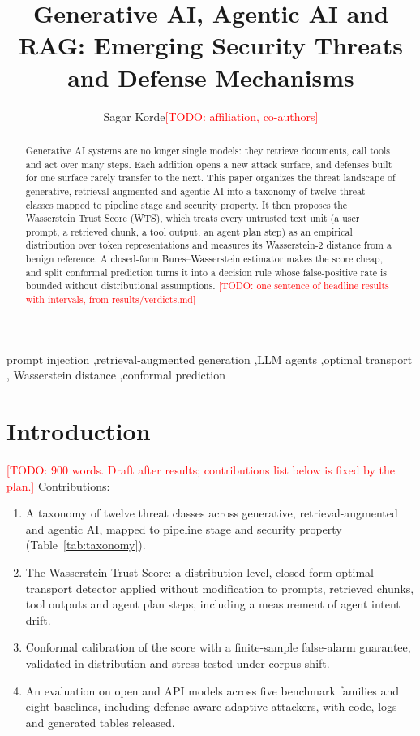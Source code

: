 \documentclass[review,12pt]{elsarticle}
\newcommand{\TODO}[1]{\textcolor{red}{[TODO: #1]}}
\begin{document}
\begin{frontmatter}
\title{Generative AI, Agentic AI and RAG: Emerging Security Threats and Defense Mechanisms}
\author{Sagar Korde\TODO{affiliation, co-authors}}
\begin{abstract}
Generative AI systems are no longer single models: they retrieve documents, call tools and act over many
steps. Each addition opens a new attack surface, and defenses built for one surface rarely transfer to the
next. This paper organizes the threat landscape of generative, retrieval-augmented and agentic AI into a
taxonomy of twelve threat classes mapped to pipeline stage and security property. It then proposes the
Wasserstein Trust Score (WTS), which treats every untrusted text unit (a user prompt, a retrieved chunk, a
tool output, an agent plan step) as an empirical distribution over token representations and measures its
Wasserstein-2 distance from a benign reference. A closed-form Bures--Wasserstein estimator makes the score
cheap, and split conformal prediction turns it into a decision rule whose false-positive rate is bounded
without distributional assumptions. \TODO{one sentence of headline results with intervals, from results/verdicts.md}
\end{abstract}
\begin{keyword}
prompt injection \sep retrieval-augmented generation \sep LLM agents \sep optimal transport \sep
Wasserstein distance \sep conformal prediction
\end{keyword}
\end{frontmatter}

\section{Introduction}\label{sec:intro}
\TODO{900 words. Draft after results; contributions list below is fixed by the plan.}
Contributions:
\begin{enumerate}
\item A taxonomy of twelve threat classes across generative, retrieval-augmented and agentic AI, mapped to
pipeline stage and security property (Table~\ref{tab:taxonomy}).
\item The Wasserstein Trust Score: a distribution-level, closed-form optimal-transport detector applied
without modification to prompts, retrieved chunks, tool outputs and agent plan steps, including a
measurement of agent intent drift.
\item Conformal calibration of the score with a finite-sample false-alarm guarantee, validated in
distribution and stress-tested under corpus shift.
\item An evaluation on open and API models across five benchmark families and eight baselines, including
defense-aware adaptive attackers, with code, logs and generated tables released.
\end{enumerate}
\end{document}
